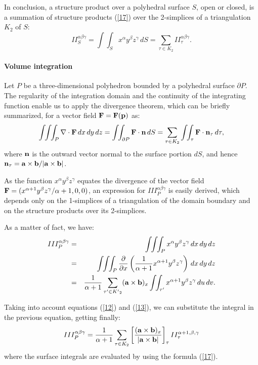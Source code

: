 \documentclass[11pt,oneside]{article}	%
\def\vint{\int\!\!\int\!\!\int}
\def\sint{\int\!\!\int}
\begin{document}
In conclusion, a structure product over a polyhedral surface $S$,
open or closed, is a summation  of structure products (\ref{17}) over 
the 2-simplices of a triangulation $K_2$ of $S$:
\begin{equation}\label{19} 
II_S^{\alpha\beta\gamma}=
\sint_S x^\alpha y^\beta z^\gamma \,dS=
\sum_{\tau\in K_2}
II_\tau^{\alpha\beta\gamma}.
\end{equation}


\paragraph{Volume integration}

Let $P$ be a three-dimensional polyhedron bounded by a polyhedral
surface $\partial P$. The regularity of the integration domain and the continuity of 
the integrating function enable us to apply the divergence theorem, which can be 
briefly summarized, for
a vector field ${\bf F}={\bf F}({\bf p})$ as:
\begin{equation}\label{21} 
\vint_P \nabla\cdot {\bf F} \,dx\,dy\,dz=
\sint_{\partial P} {\bf F}\cdot{\bf n} \,dS=
\sum_{\tau\in K_2}
\sint_{\tau} {\bf F}\cdot{\bf n}_\tau \,d\tau,
\end{equation}
where ${\bf n}$ is the outward vector normal to the surface
portion $dS$, and hence ${\bf n}_\tau={{{\bf a}\times{\bf b}}/{|{\bf a}\times{\bf b}|}}$.

As the function $x^\alpha y^\beta z^\gamma$ equates the divergence of
the vector field $ {\bf F}= ({{x^{\alpha+1} y^\beta
z^\gamma}/{\alpha+1}}, 0, 0) $, an expression for
$III_P^{\alpha\beta\gamma}$ is easily derived, which depends only on
the 1-simplices of a triangulation of the domain boundary and on the
structure products over its 2-simplices.

As a matter of fact, we have:
\begin{eqnarray}
III_P^{\alpha\beta\gamma} 
&=&
\vint_P x^\alpha y^\beta z^\gamma \,dx\,dy\,dz\nonumber\\
&=&
\vint_P 
{\partial\over{\partial x}}\left(
{{1}\over{\alpha+1}}
x^{\alpha+1} y^\beta z^\gamma \right)\,dx\,dy\,dz\nonumber\\
&=&
{1\over{\alpha+1}}
\sum_{\tau'\in {K'}_2}
({\bf a}\times{\bf b})_x
\sint_{\tau'} 
x^{\alpha+1} y^\beta z^\gamma\,du\,dv.\label{26} 
\end{eqnarray}

Taking into account  equations (\ref{12}) and (\ref{13}), we can substitute the integral in 
the previous equation, getting finally:
\begin{equation}\label{27} 
III_P^{\alpha\beta\gamma} 
=
{1\over{\alpha+1}}
\sum_{\tau\in {K}_2}
\left[
{{({\bf a}\times{\bf b})_x}\over{|{\bf a}\times{\bf b}|}}
\right]_\tau
II_\tau^{\alpha+1,\beta,\gamma}
\end{equation}
where the surface integrals are evaluated by using the formula (\ref{17}).
\end{document}
